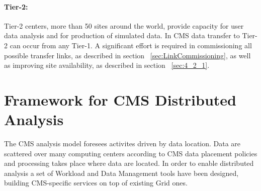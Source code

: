 
\paragraph{Tier-2:}
Tier-2 centers, more than 50 sites around the world,  provide capacity for user data analysis and for production of simulated data.
In CMS data transfer to Tier-2 can occur from any Tier-1. A significant effort is required in 
commissioning all possible transfer links, as described in section ~\ref{sec:LinkCommissioning}, as well
as improving site availability, as described in section ~\ref{sec:4_2_1}.

\section{Framework for CMS Distributed Analysis}
\label{sec:3}
The CMS analysis model foresees activites driven by data location. Data are scattered over many computing centers according to CMS data placement policies and processing takes place where data are located. In order to enable distributed analysis a set of Workload and Data Management tools have been designed, building CMS-specific services on top of existing Grid ones.

